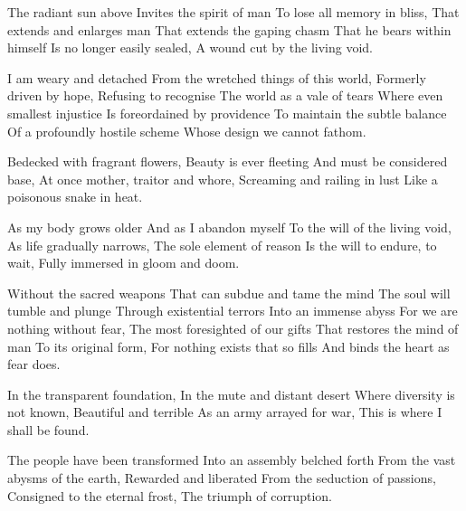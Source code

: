 \documentclass{article}
\newenvironment{stanza}{\begin{minipage}{10cm}\begin{internallinenumbers}\obeylines}{\end{internallinenumbers}\end{minipage}\vspace{\baselineskip}}
\begin{document}
\begin{stanza}
The radiant sun above
Invites the spirit of man
To lose all memory in bliss,
That extends and enlarges man
That extends the gaping chasm
That he bears within himself
Is no longer easily sealed,
A wound cut by the living void.
\end{stanza}

\begin{stanza}
I am weary and detached
From the wretched things of this world,
Formerly driven by hope,
Refusing to recognise
The world as a vale of tears
Where even smallest injustice
Is foreordained by providence
To maintain the subtle balance
Of a profoundly hostile scheme
Whose design we cannot fathom.
\end{stanza}

\begin{stanza}
Bedecked with fragrant flowers,
Beauty is ever fleeting
And must be considered base,
At once mother, traitor and whore,
Screaming and railing in lust
Like a poisonous snake in heat.
\end{stanza}

\begin{stanza}
As my body grows older
And as I abandon myself
To the will of the living void,
As life gradually narrows,
The sole element of reason
Is the will to endure, to wait,
Fully immersed in gloom and doom.
\end{stanza}

\begin{stanza}
Without the sacred weapons
That can subdue and tame the mind
The soul will tumble and plunge
Through existential terrors
Into an immense abyss
For we are nothing without fear,
The most foresighted of our gifts
That restores the mind of man
To its original form,
For nothing exists that so fills
And binds the heart as fear does.
\end{stanza}

\begin{stanza}
In the transparent foundation,
In the mute and distant desert
Where diversity is not known,
Beautiful and terrible
As an army arrayed for war,
This is where I shall be found.
\end{stanza}

\begin{stanza}
The people have been transformed
Into an assembly belched forth
From the vast abysms of the earth,
Rewarded and liberated
From the seduction of passions,
Consigned to the eternal frost,
The triumph of corruption.
\end{stanza}
\end{document}
